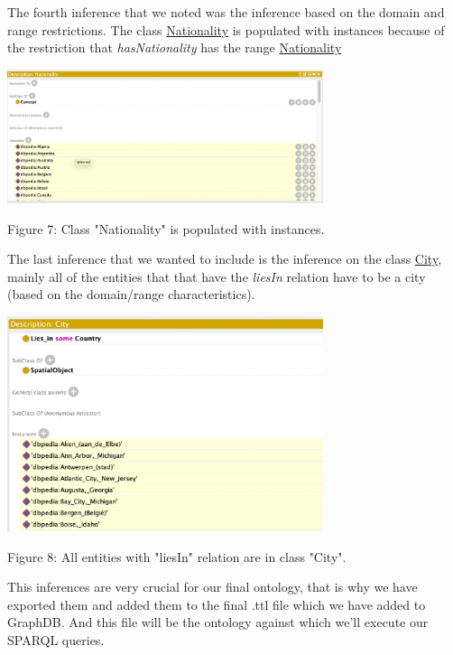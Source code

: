\documentclass{article}
\begin{document}
The fourth inference that we noted was the inference based on the domain and range restrictions. The class \underline{Nationality} is populated with instances because of the restriction that \textit{hasNationality} has the range \underline{Nationality}
\begin{center}
\includegraphics[width=350]{fourth_inference.png}
\newline
\caption{Figure 7: Class "Nationality" is populated with instances.}
\end{center}
\newline
The last inference that we wanted to include is the inference on the class \underline{City}, mainly all of the entities that that have the \textit{liesIn} relation have to be a city (based on the domain/range characteristics).

\begin{center}
\includegraphics[width=350]{third_inferece.png}
\newline
\caption{Figure 8: All entities with "liesIn" relation are in class "City".}
\end{center}
This inferences are very crucial for our final ontology, that is why we have exported them and added them to
the final .ttl file which we have added to GraphDB. And this file will be the ontology against which we'll execute our SPARQL queries.
\end{document}
